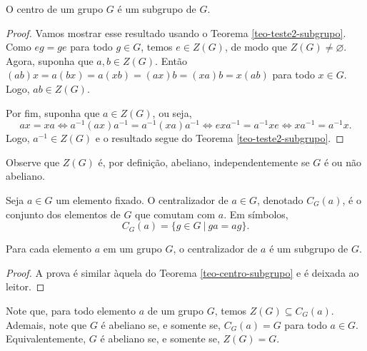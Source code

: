 %
\begin{theorem}
\label{teo-centro-subgrupo}
    O centro de um grupo $G$ é um subgrupo de $G$.
\end{theorem}
%
\begin{proof}
    Vamos mostrar esse resultado usando o Teorema \ref{teo-teste2-subgrupo}. Como
    $eg = ge$ para todo $g\in G$, temos $e\in Z(G)$, de modo que $Z(G)\neq\varnothing$.
    Agora, suponha que $a,b\in Z(G)$. Então $(ab)x = a(bx) = a(xb) = (ax)b = (xa)b = x(ab)$ para
    todo $x\in G$. Logo, $ab\in Z(G)$.
    
    Por fim, suponha que $a\in Z(G)$, ou seja,
    \[
    ax = xa \iff a^{-1}(ax)a^{-1} = a^{-1}(xa)a^{-1} \iff exa^{-1} = a^{-1}xe \iff xa^{-1} = a^{-1}x. 
    \]
    Logo, $a^{-1}\in Z(G)$ e o resultado segue do Teorema \ref{teo-teste2-subgrupo}.
\end{proof}
%
Observe que $Z(G)$ é, por definição, abeliano, independentemente se $G$ é ou não abeliano.
%
\begin{definition}[Centralizador]
\label{def-centralizador}
    Seja $a\in G$ um elemento fixado. O centralizador de $a\in G$, denotado $C_G(a)$,
    é o conjunto dos elementos de $G$ que comutam com $a$. Em símbolos,
    \[
    C_G(a) = \{ g\in G \ | \ ga = ag \}.
    \]
\end{definition}
%
\begin{theorem}
\label{teo-centralizador-subgrupo}
    Para cada elemento $a$ em um grupo $G$, o centralizador de $a$ é um subgrupo de $G$.
\end{theorem}
%
\begin{proof}
    A prova é similar àquela do Teorema \ref{teo-centro-subgrupo} e é deixada ao leitor.
\end{proof}
%
\begin{remark}
    Note que, para todo elemento $a$ de um grupo $G$, temos $Z(G)\subseteq C_G(a)$. Ademais,
    note que $G$ é abeliano se, e somente se, $C_G(a) = G$ para todo $a\in G$. Equivalentemente,
    $G$ é abeliano se, e somente se, $Z(G) = G$.
\end{remark}
%
